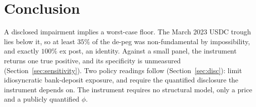 
\section{Conclusion}
\label{sec:conc}

A disclosed impairment implies a worst-case floor. The March 2023 USDC trough lies
below it, so at least $35\%$ of the de-peg was non-fundamental by impossibility, and exactly $100\%$
ex post, an identity. Against a small panel, the instrument returns one true positive, and its
specificity is unmeasured (Section~\ref{sec:sensitivity}). Two policy readings follow (Section~\ref{sec:disc}): limit idiosyncratic bank-deposit exposure, and require
the quantified disclosure the instrument depends on. The instrument
requires no structural model, only a price and a publicly quantified $\phi$.
